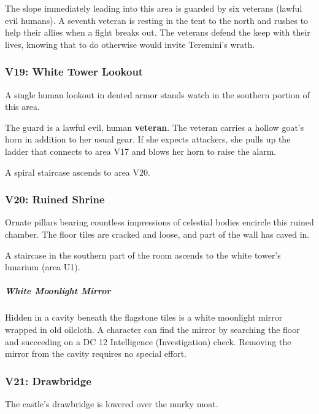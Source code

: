 \documentclass[10pt,a4paper,twoside,bg=print,twocolumn,openany,nodeprecatedcode]{dndbook}
\begin{document}
The slope immediately leading into this area is guarded by six veterans (lawful evil humans). A seventh veteran is resting in the tent to the north and rushes to help their allies when a fight breaks out. The veterans defend the keep with their lives, knowing that to do otherwise would invite Teremini's wrath.

\subsubsection{V19: White Tower Lookout}
\begin{DndReadAloud}{}
A single human lookout in dented armor stands watch in the southern portion of this area.

\end{DndReadAloud}

The guard is a lawful evil, human \textbf{veteran}. The veteran carries a hollow goat's horn in addition to her usual gear. If she expects attackers, she pulls up the ladder that connects to area V17 and blows her horn to raise the alarm.

A spiral staircase ascends to area V20.

\subsubsection{V20: Ruined Shrine}
\begin{DndReadAloud}{}
Ornate pillars bearing countless impressions of celestial bodies encircle this ruined chamber. The floor tiles are cracked and loose, and part of the wall has caved in.

\end{DndReadAloud}

A staircase in the southern part of the room ascends to the white tower's lunarium (area U1).

\subparagraph{White Moonlight Mirror}
Hidden in a cavity beneath the flagstone tiles is a white moonlight mirror wrapped in old oilcloth. A character can find the mirror by searching the floor and succeeding on a DC 12 Intelligence (Investigation) check. Removing the mirror from the cavity requires no special effort.

\subsubsection{V21: Drawbridge}
\begin{DndReadAloud}{}
The castle's drawbridge is lowered over the murky moat.

\end{DndReadAloud}
\end{document}
